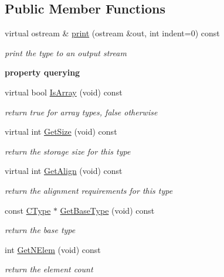 \subsection*{Public Member Functions}
\begin{DoxyCompactItemize}
\item 
virtual ostream \& \hyperlink{classCArrayType_abb5c36950850fab59c1f8fe60b2720b8}{print} (ostream \&out, int indent=0) const 
\begin{DoxyCompactList}\small\item\em print the type to an output stream \end{DoxyCompactList}\end{DoxyCompactItemize}
\begin{Indent}{\bf property querying}\par
\begin{DoxyCompactItemize}
\item 
\hypertarget{classCArrayType_aaf52b2990fb194af4dfd0d0bb5206456}{virtual bool \hyperlink{classCArrayType_aaf52b2990fb194af4dfd0d0bb5206456}{Is\-Array} (void) const }\label{classCArrayType_aaf52b2990fb194af4dfd0d0bb5206456}

\begin{DoxyCompactList}\small\item\em return {\itshape true} for array types, {\itshape false} otherwise \end{DoxyCompactList}\item 
virtual int \hyperlink{classCArrayType_af21021c15b1796c621fe93135c5d2b5f}{Get\-Size} (void) const 
\begin{DoxyCompactList}\small\item\em return the storage size for this type \end{DoxyCompactList}\item 
virtual int \hyperlink{classCArrayType_a11a7cefacbb2dee4784039ed398a0b90}{Get\-Align} (void) const 
\begin{DoxyCompactList}\small\item\em return the alignment requirements for this type \end{DoxyCompactList}\item 
const \hyperlink{classCType}{C\-Type} $\ast$ \hyperlink{classCArrayType_a2818f0da73b135b7ffe311b17bdcd4f8}{Get\-Base\-Type} (void) const 
\begin{DoxyCompactList}\small\item\em return the base type \end{DoxyCompactList}\item 
int \hyperlink{classCArrayType_a66417b72b3ebdba20eaf993be4d343d1}{Get\-N\-Elem} (void) const 
\begin{DoxyCompactList}\small\item\em return the element count \end{DoxyCompactList}\end{DoxyCompactItemize}
\end{Indent}
